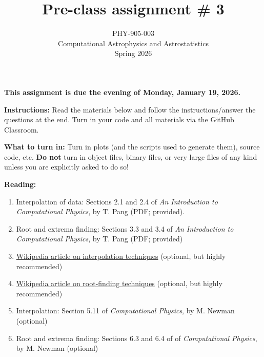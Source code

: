 \documentclass[10pt]{article}
\title{Pre-class assignment \# 3}
\author{PHY-905-003\\Computational Astrophysics and
  Astrostatistics\\Spring 2026}
\date{} %
\begin{document}
 
\maketitle

\vspace{-5mm}

\noindent
\textbf{This assignment is due the evening of Monday, January 19,
  2026.}

\vspace{5mm}

\noindent
\textbf{Instructions:} Read the materials below and follow
the instructions/answer the questions at the end.  Turn in your code
and all materials via the GitHub Classroom.

\vspace{5mm}

\noindent
\textbf{What to turn in:} Turn in plots (and the scripts
used to generate them), source code, etc.
\textbf{Do not} turn in object files, binary files, or very large
files of any kind unless you are explicitly asked to do so!

\vspace{5mm}

\noindent
\textbf{Reading:}

\begin{enumerate}

\item Interpolation of data: Sections 2.1 and 2.4 of \textit{An Introduction to Computational Physics},
  by T. Pang (PDF; provided).  

\item Root and extrema finding:  Sections 3.3 and 3.4 of \textit{An Introduction to Computational Physics},
  by T. Pang (PDF; provided) 

\item 
  \href{https://en.wikipedia.org/wiki/Interpolation}{Wikipedia article
    on interpolation techniques}  (optional, but highly recommended)

\item 
  \href{https://en.wikipedia.org/wiki/Root-finding_algorithm}{Wikipedia article
    on root-finding techniques}  (optional, but highly recommended)

\item Interpolation: Section 5.11 of \textit{Computational Physics}, by M. Newman (optional)

\item Root and extrema finding:  Sections 6.3 and 6.4 of of
  \textit{Computational Physics}, by M. Newman (optional)

\end{enumerate}
\end{document}
